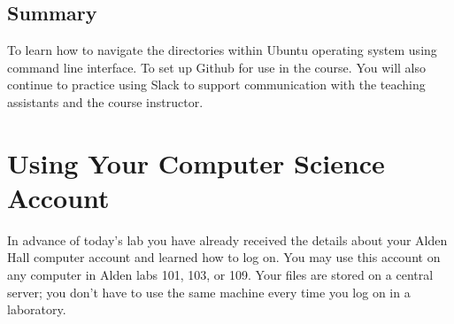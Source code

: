 
\newcommand{\command}[1]{``\lstinline{#1}''}
\newcommand{\program}[1]{\lstinline{#1}}
\newcommand{\channel}[1]{\lstinline{#1}}
\newcommand{\option}[1]{``{#1}''}
\newcommand{\step}[1]{``{#1}''}



\subsection*{Summary}
To learn how to navigate the directories within Ubuntu operating system using command line interface. To set up Github for use in the course. You will
also continue to practice using Slack to support communication with the teaching assistants and the course instructor.


\vspace*{-.2in}
\section*{Using Your Computer Science Account}
\vspace*{-.1in}
In advance of today's lab you have already received the details about your Alden Hall computer account and learned how
to log on. You may use this account on any computer in Alden labs 101, 103, or
109. Your files are stored on a central server; you don't have to use the same machine every time you log on in a laboratory.

